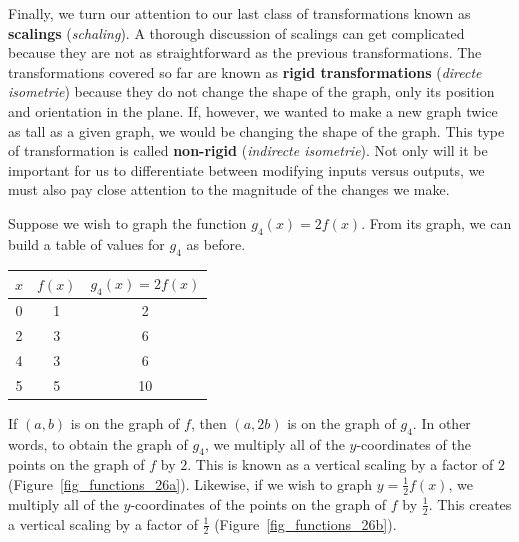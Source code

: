 Finally, we turn our attention to our last class of transformations known as \textbf{scalings} (\textit{schaling}).  A thorough discussion of scalings can get complicated because they are not as straightforward as the previous transformations.  The transformations covered so far are known as \textbf{rigid transformations} (\textit{directe isometrie}) because they do not change the shape of the graph, only its position and orientation in the plane.  If, however, we wanted to make a new graph twice as tall as a given graph, we would be changing the shape of the graph. This type of transformation is called \textbf{non-rigid} (\textit{indirecte isometrie}).  Not only will it be important for us to differentiate between modifying inputs versus outputs, we must also pay close attention to the magnitude of the changes we make.
 
 

Suppose we wish to graph the function $g_4(x) =2 f(x)$. From its graph, we can build a table of values for $g_4$ as before.
\begin{center}
\begin{tabular}{c|cc}  
$x$  & $f(x)$ & $g_4(x)=2f(x)$  \\ \hline\hline
0  & 1 & 2 \\  
2  & 3 &  6  \\  
4  & 3 &  6 \\  
5  & 5 &  10  \\
\end{tabular} 
\end{center}

If $(a,b)$ is on the graph of $f$, then $(a,2b)$ is on the graph of $g_4$.  In other words, to obtain the graph of $g_4$, we multiply all of the $y$-coordinates of the points on the graph of $f$ by $2$.  This is known as a vertical scaling by a factor of $2$ (Figure~\ref{fig_functions_26a}). Likewise, if we wish to graph $y = \frac{1}{2} f(x)$, we multiply all of the $y$-coordinates of the points on the graph of $f$ by $\frac{1}{2}$.  This creates a vertical scaling by a factor of $\frac{1}{2}$ (Figure~\ref{fig_functions_26b}).

